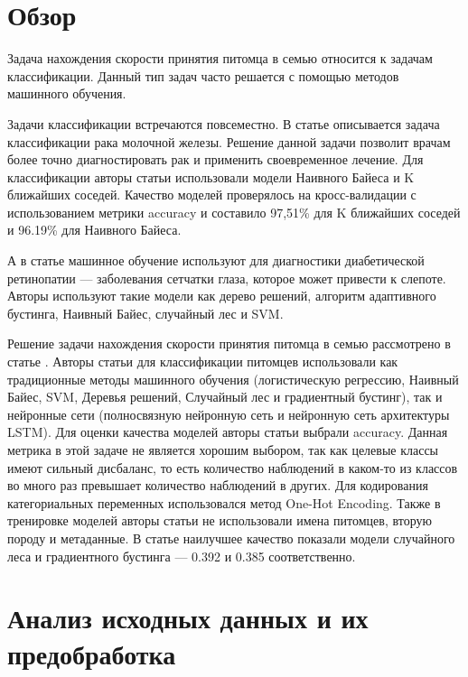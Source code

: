\documentclass[14pt]{mmcs_article}
\begin{document}
\newpage
{}
\section*{Обзор}

Задача нахождения скорости принятия питомца в семью относится к задачам классификации. Данный тип задач часто решается с помощью методов машинного обучения. 
 
Задачи классификации встречаются повсеместно. В статье \cite{lib:obz1} описывается задача классификации рака молочной железы. Решение данной задачи позволит врачам более точно диагностировать рак и применить своевременное лечение. Для классификации авторы статьи использовали модели Наивного Байеса и K ближайших соседей. Качество моделей проверялось на кросс-валидации с использованием метрики accuracy и составило 97,51\% для K ближайших соседей и 96.19\% для Наивного Байеса.

А в статье \cite{lib:obz2} машинное обучение используют для диагностики диабетической ретинопатии — заболевания сетчатки глаза, которое может привести к слепоте. Авторы используют такие модели как дерево решений, алгоритм адаптивного бустинга, Наивный Байес, случайный лес и SVM.

Решение задачи нахождения скорости принятия питомца в семью рассмотрено в статье \cite{lib:obz3}. Авторы статьи для классификации питомцев использовали как традиционные методы машинного обучения (логистическую регрессию, Наивный Байес, SVM, Деревья решений, Случайный лес и градиентный бустинг), так и нейронные сети (полносвязную нейронную сеть и нейронную сеть архитектуры LSTM). Для оценки качества моделей авторы статьи выбрали accuracy. Данная метрика в этой задаче не является хорошим выбором, так как целевые классы имеют сильный дисбаланс, то есть количество наблюдений в каком-то из классов во много раз превышает количество наблюдений в других. Для кодирования категориальных переменных использовался метод One-Hot Encoding. Также в тренировке моделей авторы статьи не использовали имена питомцев, вторую породу и метаданные. В статье наилучшее качество показали модели случайного леса и градиентного бустинга — 0.392 и 0.385 соответственно.


\newpage
\section{Анализ исходных данных и их предобработка}
\end{document}
